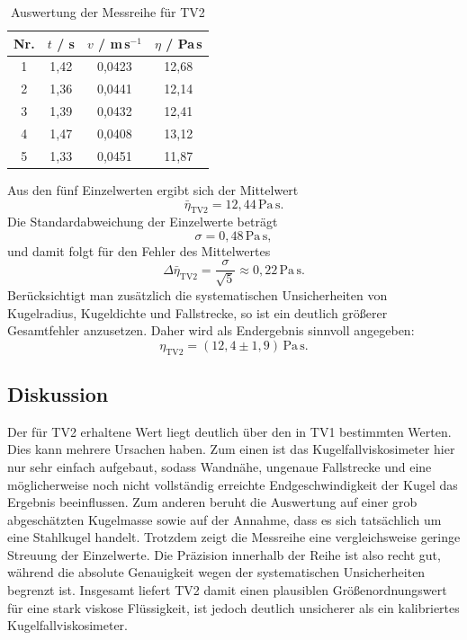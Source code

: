 \documentclass{report}
\begin{document}
\begin{table}[H]
\centering
\caption{Auswertung der Messreihe für TV2}
\begin{tabular}{c c c c}
\toprule
Nr. & $t$ / s & $v$ / m\,s$^{-1}$ & $\eta$ / Pa\,s \\
\midrule
1 & 1{,}42 & 0{,}0423 & 12{,}68 \\
2 & 1{,}36 & 0{,}0441 & 12{,}14 \\
3 & 1{,}39 & 0{,}0432 & 12{,}41 \\
4 & 1{,}47 & 0{,}0408 & 13{,}12 \\
5 & 1{,}33 & 0{,}0451 & 11{,}87 \\
\bottomrule
\end{tabular}
\end{table}

Aus den fünf Einzelwerten ergibt sich der Mittelwert
\begin{equation}
    \bar{\eta}_{\mathrm{TV2}} = 12{,}44\,\mathrm{Pa\,s}.
\end{equation}
\noindent
Die Standardabweichung der Einzelwerte beträgt
\begin{equation}
    \sigma = 0{,}48\,\mathrm{Pa\,s},
\end{equation}
und damit folgt für den Fehler des Mittelwertes
\begin{equation}
    \Delta \bar{\eta}_{\mathrm{TV2}}
    = \frac{\sigma}{\sqrt{5}}
    \approx 0{,}22\,\mathrm{Pa\,s}.
\end{equation}
\noindent
Berücksichtigt man zusätzlich die systematischen Unsicherheiten von Kugelradius,
Kugeldichte und Fallstrecke, so ist ein deutlich größerer Gesamtfehler anzusetzen.
Daher wird als Endergebnis sinnvoll angegeben:
\begin{equation}
    \eta_{\mathrm{TV2}} = (12{,}4 \pm 1{,}9)\,\mathrm{Pa\,s}.
\end{equation}

\subsection{Diskussion}

Der für TV2 erhaltene Wert liegt deutlich über den in TV1 bestimmten Werten. Dies kann
mehrere Ursachen haben. Zum einen ist das Kugelfallviskosimeter hier nur sehr einfach
aufgebaut, sodass Wandnähe, ungenaue Fallstrecke und eine möglicherweise noch nicht
vollständig erreichte Endgeschwindigkeit der Kugel das Ergebnis beeinflussen. Zum anderen
beruht die Auswertung auf einer grob abgeschätzten Kugelmasse sowie auf der Annahme, dass
es sich tatsächlich um eine Stahlkugel handelt.
\noindent
Trotzdem zeigt die Messreihe eine vergleichsweise geringe Streuung der Einzelwerte.
Die Präzision innerhalb der Reihe ist also recht gut, während die absolute Genauigkeit
wegen der systematischen Unsicherheiten begrenzt ist.
\noindent
Insgesamt liefert TV2 damit einen plausiblen Größenordnungswert für eine stark viskose
Flüssigkeit, ist jedoch deutlich unsicherer als ein kalibriertes Kugelfallviskosimeter.
\end{document}
